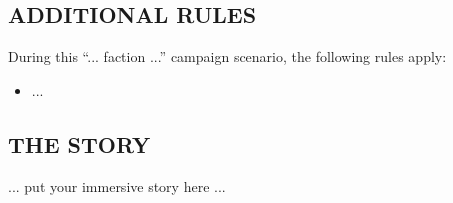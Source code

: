 \begin{multicols*}{2}
\subsection*{\MakeUppercase{Additional rules}}

During this ``... faction ...'' campaign scenario, the following rules apply:

\begin{itemize}
  \item ...
\end{itemize}

\end{multicols*}

\newpage



\newpage

\begin{multicols*}{2}

\subsection*{\MakeUppercase{The story}}

... put your immersive story here ...

\end{multicols*}
